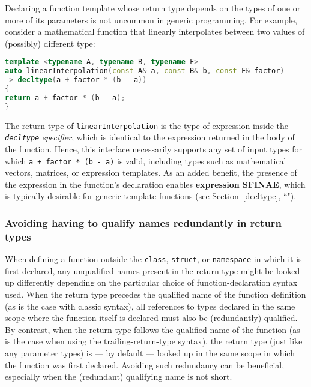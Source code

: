 Declaring a function template whose return type depends on the types of
one or more of its parameters is not uncommon in generic programming.
For example, consider a mathematical function that linearly interpolates
between two values of (possibly) different type:

\begin{lstlisting}[language=C++]
template <typename A, typename B, typename F>
auto linearInterpolation(const A& a, const B& b, const F& factor)
-> decltype(a + factor * (b - a))
{
return a + factor * (b - a);
}
\end{lstlisting}

\noindent The return type of \texttt{linearInterpolation} is the type of
expression inside the \emph{\texttt{decltype} specifier}, which is
identical to the expression returned in the body of the function. Hence,
this interface necessarily supports any set of input types for which
\texttt{a}~\texttt{+}~\texttt{factor}~\texttt{*}~\texttt{(b}~\texttt{-}~\texttt{a)}
is valid, including types such as mathematical vectors, matrices, or
expression templates. As an added benefit, the presence of the
expression in the function's declaration enables \textbf{expression
SFINAE}, which is typically desirable for generic template functions
(see Section~\ref{decltype}, ``").

\subsubsection[Avoiding having to qualify names redundantly in return types]{Avoiding having to qualify names redundantly in return types}\label{avoiding-having-to-qualify-names-redundantly-in-return-types}

When defining a function outside the \texttt{class}, \texttt{struct}, or
\texttt{namespace} in which it is first declared, any unqualified names
present in the return type might be looked up differently depending on
the particular choice of function-declaration syntax used. When the
return type precedes the qualified name of the function definition (as
is the case with classic syntax), all references to types declared in
the same scope where the function itself is declared must also be
(redundantly) qualified. By contrast, when the return type follows the
qualified name of the function (as is the case when using the
trailing-return-type syntax), the return type (just like any parameter
types) is --- by default --- looked up in the same scope in which the
function was first declared. Avoiding such redundancy can be beneficial, especially when the (redundant) qualifying name is not short.

